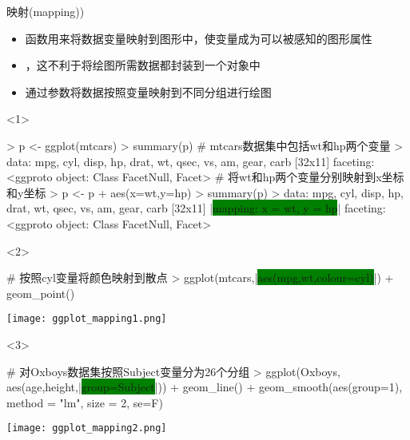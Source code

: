 \begin{frame}[t,fragile]{\subsecname}{映射(mapping))}
\begin{itemize}
\item<1-> 函数用来将数据变量映射到图形中，使变量成为可以被感知的图形属性
\item<1-> ，这不利于将绘图所需数据都封装到一个对象中
\item<3-> 通过参数将数据按照变量映射到不同分组进行绘图
\end{itemize}

\begin{onlyenv}<1>
\begin{rcode}
> p <- ggplot(mtcars)
> summary(p)
# mtcars数据集中包括wt和hp两个变量
> data: mpg, cyl, disp, hp, drat, wt, qsec, vs, am, gear, carb [32x11]
  faceting: <ggproto object: Class FacetNull, Facet>
# 将wt和hp两个变量分别映射到x坐标和y坐标
> p <- p + aes(x=wt,y=hp)
> summary(p)
> data: mpg, cyl, disp, hp, drat, wt, qsec, vs, am, gear, carb [32x11]
  |\colorbox{green}{mapping:  x = wt, y = hp}|
  faceting: <ggproto object: Class FacetNull, Facet>
\end{rcode}
\end{onlyenv}

\begin{onlyenv}<2>
\begin{minipage}{\textwidth}
\begin{rcode}
# 按照cyl变量将颜色映射到散点 
> ggplot(mtcars,|\colorbox{green}{aes(mpg,wt,colour=cyl)}|) + geom_point()
\end{rcode}
\end{minipage}

\begin{minipage}{\textwidth}
\centering
\texttt{[image: ggplot\_mapping1.png]}
\end{minipage}
\end{onlyenv}

\begin{onlyenv}<3>
\begin{minipage}{\textwidth}
\begin{rcode}
# 对Oxboys数据集按照Subject变量分为26个分组
> ggplot(Oxboys, aes(age,height,|\colorbox{green}{group=Subject}|)) + geom_line() +
     geom_smooth(aes(group=1), method = "lm", size = 2, se=F)
\end{rcode}
\end{minipage}

\begin{minipage}{\textwidth}
\centering
\texttt{[image: ggplot\_mapping2.png]}
\end{minipage}
\end{onlyenv}
\end{frame}

